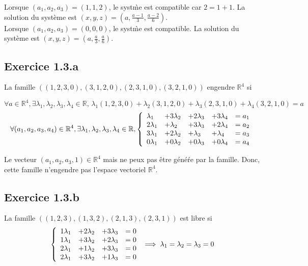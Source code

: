 \documentclass[]{book}
\theoremstyle{definition}
\newcommand{\bb}[1]{\mathbb{#1}}
\newcommand{\R}{\bb{R}}
\begin{document}
Lorsque $(a_1,a_2,a_3) = (1,1,2)$, le syst\`me est compatible car $2 = 1+1$. 
La solution du syst\`eme est $(x,y,z)=(a,\frac{a-1}{3},\frac{a-2}{6})$.\\

Lorsque $(a_1,a_2,a_3) = (0,0,0)$, le syst\`me est compatible. La solution du syst\`eme est $(x,y,z)=(a,\frac{a}{3},\frac{a}{6})$.\\


\subsection*{Exercice 1.3.a}
La famille $((1, 2, 3, 0), (3, 1, 2, 0), (2, 3, 1, 0), (3, 2, 1, 0))$ engendre $\R^4$ si

$$ \forall a \in \R^4, \exists \lambda_1,\lambda_2,\lambda_3,\lambda_4 \in \R,\, 
\lambda_1(1,2,3,0) + \lambda_2 (3,1,2,0) + \lambda_3 (2,3,1,0) + \lambda_4 (3,2,1,0) = a$$ 
$$ \forall (a_1, a_2, a_3, a_4) \in \R^4, \exists \lambda_1,\lambda_2,\lambda_3,\lambda_4 \in \R,
\left\{ 
\begin{array}{l l l l l}
   \lambda_1 & +3\lambda_2 & +2\lambda_3 & +3\lambda_4  & = a_1 \\
  2\lambda_1 & + \lambda_2 & +3\lambda_3 & +2\lambda_4  & = a_2 \\
  3\lambda_1 & +2\lambda_2 & + \lambda_3 & + \lambda_4  & = a_3 \\
  0\lambda_1 & +0\lambda_2 & +0\lambda_3 & +0\lambda_4  & = a_4 \\
\end{array}
\right. 
$$

Le vecteur $(a_1, a_2, a_3, 1) \in \R^4$ mais ne peux pas \^etre g\'en\'e\'re par la famille. Donc, cette famille n'engendre pas l'espace vectoriel $\R^4$.

\subsection*{Exercice 1.3.b}
La famille $((1, 2, 3), (1, 3, 2), (2, 1, 3), (2, 3, 1))$ est libre si
$$
\left\{ 
\begin{array}{l l l l}
  1\lambda_1 & +2\lambda_2 & +3\lambda_3   & = 0 \\
  1\lambda_1 & +3\lambda_2 & +2\lambda_3   & = 0 \\
  2\lambda_1 & +1\lambda_2 & +3\lambda_3   & = 0 \\
  2\lambda_1 & +3\lambda_2 & +1\lambda_3   & = 0 \\
\end{array}
\right. 
\implies
\lambda_1=\lambda_2=\lambda_3=0
$$
\end{document}

